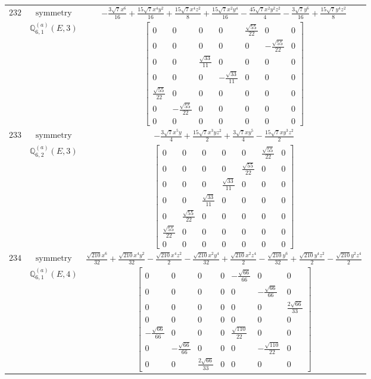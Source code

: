 \documentclass[fleqn,8pt,landscape]{jsarticle}
\begin{document}
\begin{longtable}{ccc}
$ 232 $ & $ \text{symmetry} $ & $ - \frac{3 \sqrt{7} x^{6}}{16} + \frac{15 \sqrt{7} x^{4} y^{2}}{16} + \frac{15 \sqrt{7} x^{4} z^{2}}{8} + \frac{15 \sqrt{7} x^{2} y^{4}}{16} - \frac{45 \sqrt{7} x^{2} y^{2} z^{2}}{4} - \frac{3 \sqrt{7} y^{6}}{16} + \frac{15 \sqrt{7} y^{4} z^{2}}{8} $ \\
$  $ & $ \mathbb{Q}_{6,1}^{(a)}(E,3) $ & $ \begin{bmatrix} 0 & 0 & 0 & 0 & \frac{\sqrt{55}}{22} & 0 & 0 \\ 0 & 0 & 0 & 0 & 0 & - \frac{\sqrt{55}}{22} & 0 \\ 0 & 0 & \frac{\sqrt{33}}{11} & 0 & 0 & 0 & 0 \\ 0 & 0 & 0 & - \frac{\sqrt{33}}{11} & 0 & 0 & 0 \\ \frac{\sqrt{55}}{22} & 0 & 0 & 0 & 0 & 0 & 0 \\ 0 & - \frac{\sqrt{55}}{22} & 0 & 0 & 0 & 0 & 0 \\ 0 & 0 & 0 & 0 & 0 & 0 & 0 \end{bmatrix} $ \\ \hline
$ 233 $ & $ \text{symmetry} $ & $ - \frac{3 \sqrt{7} x^{5} y}{4} + \frac{15 \sqrt{7} x^{3} y z^{2}}{2} + \frac{3 \sqrt{7} x y^{5}}{4} - \frac{15 \sqrt{7} x y^{3} z^{2}}{2} $ \\
$  $ & $ \mathbb{Q}_{6,2}^{(a)}(E,3) $ & $ \begin{bmatrix} 0 & 0 & 0 & 0 & 0 & \frac{\sqrt{55}}{22} & 0 \\ 0 & 0 & 0 & 0 & \frac{\sqrt{55}}{22} & 0 & 0 \\ 0 & 0 & 0 & \frac{\sqrt{33}}{11} & 0 & 0 & 0 \\ 0 & 0 & \frac{\sqrt{33}}{11} & 0 & 0 & 0 & 0 \\ 0 & \frac{\sqrt{55}}{22} & 0 & 0 & 0 & 0 & 0 \\ \frac{\sqrt{55}}{22} & 0 & 0 & 0 & 0 & 0 & 0 \\ 0 & 0 & 0 & 0 & 0 & 0 & 0 \end{bmatrix} $ \\ \hline
$ 234 $ & $ \text{symmetry} $ & $ \frac{\sqrt{210} x^{6}}{32} + \frac{\sqrt{210} x^{4} y^{2}}{32} - \frac{\sqrt{210} x^{4} z^{2}}{2} - \frac{\sqrt{210} x^{2} y^{4}}{32} + \frac{\sqrt{210} x^{2} z^{4}}{2} - \frac{\sqrt{210} y^{6}}{32} + \frac{\sqrt{210} y^{4} z^{2}}{2} - \frac{\sqrt{210} y^{2} z^{4}}{2} $ \\
$  $ & $ \mathbb{Q}_{6,1}^{(a)}(E,4) $ & $ \begin{bmatrix} 0 & 0 & 0 & 0 & - \frac{\sqrt{66}}{66} & 0 & 0 \\ 0 & 0 & 0 & 0 & 0 & - \frac{\sqrt{66}}{66} & 0 \\ 0 & 0 & 0 & 0 & 0 & 0 & \frac{2 \sqrt{66}}{33} \\ 0 & 0 & 0 & 0 & 0 & 0 & 0 \\ - \frac{\sqrt{66}}{66} & 0 & 0 & 0 & \frac{\sqrt{110}}{22} & 0 & 0 \\ 0 & - \frac{\sqrt{66}}{66} & 0 & 0 & 0 & - \frac{\sqrt{110}}{22} & 0 \\ 0 & 0 & \frac{2 \sqrt{66}}{33} & 0 & 0 & 0 & 0 \end{bmatrix} $ \\ \hline

\end{longtable}
\end{document}
